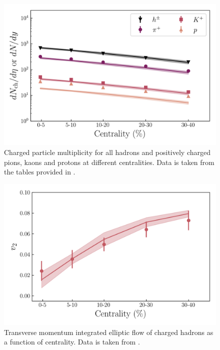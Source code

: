 \begin{figure}[!hbt]
	\includegraphics[width=\textwidth]{images/dn_cent_bulk.png}
	\caption{\normalsize Charged particle multiplicity for all hadrons and positively charged pions, kaons and protons at different centralities. Data is taken from the tables provided in \cite{Abelev:2008ab}. } 
\end{figure}

\begin{figure}[!hbt]
	\includegraphics[width=\textwidth]{images/vn_cent_bulk.png}
	\caption{\normalsize Transverse momentum integrated elliptic flow of charged hadrons as a function of centrality. Data is taken from \cite{Abelev:2008ae}.} 
\end{figure}

